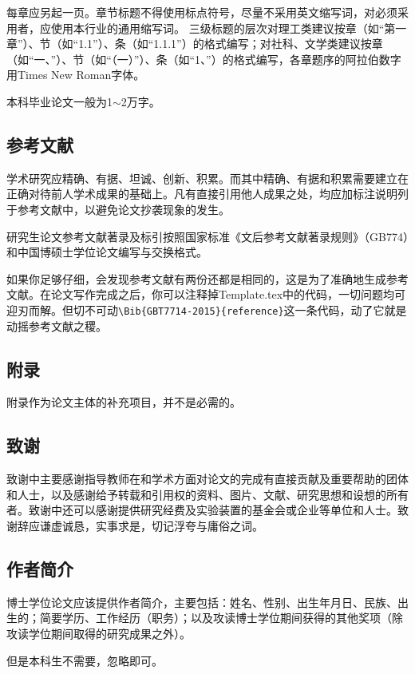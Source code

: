 每章应另起一页。章节标题不得使用标点符号，尽量不采用英文缩写词，对必须采用者，应使用本行业的通用缩写词。
三级标题的层次对理工类建议按章（如“第一章”）、节（如“1.1”）、条（如“1.1.1”）的格式编写；对社科、文学类建议按章（如“一、”）、节（如“（一）”）、条（如“1、”）的格式编写，各章题序的阿拉伯数字用Times New Roman字体。

本科毕业论文一般为1$\sim$2万字。

\subsection{参考文献}

学术研究应精确、有据、坦诚、创新、积累。而其中精确、有据和积累需要建立在正确对待前人学术成果的基础上。凡有直接引用他人成果之处，均应加标注说明列于参考文献中，以避免论文抄袭现象的发生。

研究生论文参考文献著录及标引按照国家标准《文后参考文献著录规则》（GB774）和中国博硕士学位论文编写与交换格式。

如果你足够仔细，会发现参考文献有两份还都是相同的，这是为了准确地生成参考文献。在论文写作完成之后，你可以注释掉Template.tex中的\verb||代码，一切问题均可迎刃而解。但切不可动\verb|\Bib{GBT7714-2015}{reference}|这一条代码，动了它就是动摇参考文献之稷。



\subsection{附录}

附录作为论文主体的补充项目，并不是必需的。

\subsection{致谢}
致谢中主要感谢指导教师在和学术方面对论文的完成有直接贡献及重要帮助的团体和人士，以及感谢给予转载和引用权的资料、图片、文献、研究思想和设想的所有者。致谢中还可以感谢提供研究经费及实验装置的基金会或企业等单位和人士。致谢辞应谦虚诚恳，实事求是，切记浮夸与庸俗之词。

\subsection{作者简介}

博士学位论文应该提供作者简介，主要包括：姓名、性别、出生年月日、民族、出生的；简要学历、工作经历（职务）；以及攻读博士学位期间获得的其他奖项（除攻读学位期间取得的研究成果之外）。

但是本科生不需要，忽略即可。
